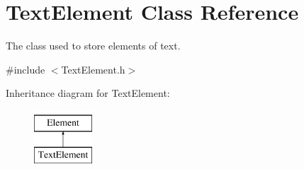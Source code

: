 \hypertarget{class_text_element}{\section{Text\-Element Class Reference}
\label{class_text_element}
}


The class used to store elements of text.  




{\ttfamily \#include $<$Text\-Element.\-h$>$}

Inheritance diagram for Text\-Element\-:\begin{figure}[H]
\begin{center}
\leavevmode
\includegraphics[height=2.000000cm]{class_text_element}
\end{center}
\end{figure}
